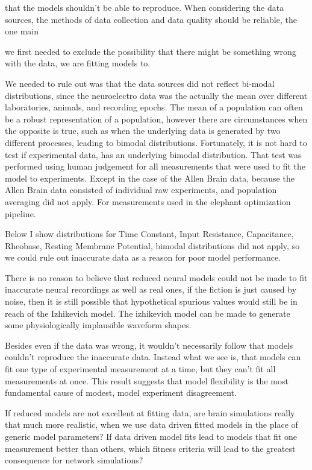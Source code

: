 that the models shouldn't be able to reproduce. When considering the data sources, the methods of data collection and data quality should be reliable, the one main 

we first needed to exclude the possibility that there might be something wrong with the data, we are fitting models to.

We needed to rule out was that the data sources did not reflect bi-modal distributions, since the neuroelectro data was the actually the mean over different laboratories, animals, and recording epochs. The mean of a population can often be a robust representation of a population, however there are circumstances when the opposite is true, such as when the underlying data is generated by two different processes, leading to bimodal distributions. Fortunately, it is not hard to test if experimental data, has an underlying bimodal distribution. That test was performed using human judgement for all measurements that were used to fit the model to experiments. Except in the case of the Allen Brain data, because the Allen Brain data consisted of individual raw experiments, and population averaging did not apply. For measurements used in the elephant optimization pipeline.

Below I show distributions for  Time Constant, Input Resistance, Capacitance, Rheobase, Resting Membrane Potential, bimodal distributions did not apply, so we could rule out inaccurate data as a reason for poor model performance.

There is no reason to believe that reduced neural models could not be made to fit inaccurate neural recordings as well as real ones, if the fiction is just caused by noise, then it is still possible that hypothetical spurious values would still be in reach of the Izhikevich model. The izhikevich model can be made to generate some physiologically implausible waveform shapes. 

Besides even if the data was wrong, it wouldn't necessarily follow that models couldn't reproduce the inaccurate data. Instead what we see is, that models can fit one type of experimental measurement at a time, but they can't fit all measurements at once. This result suggests that model flexibility is the most fundamental cause of modest, model experiment disagreement.


If reduced models are not excellent at fitting data, are brain simulations really that much more realistic, when we use data driven fitted models in the place of generic model parameters? If data driven model fits lead to models that fit one measurement better than others, which fitness criteria will lead to the greatest consequence for network simulations?


